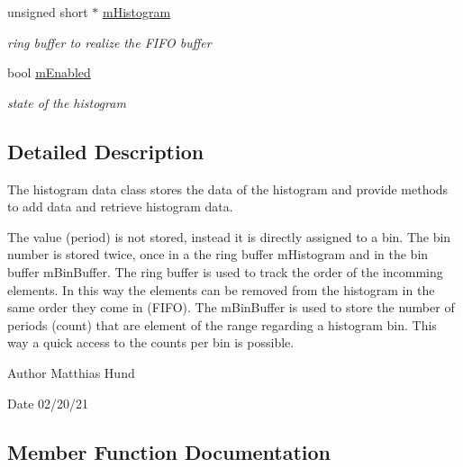 \begin{DoxyCompactItemize}
\mbox{\label{classHistogramData_a7ad41d77119ca0442b8c31f7f8122a8b}} 
unsigned short $\ast$ \hyperlink{classHistogramData_a7ad41d77119ca0442b8c31f7f8122a8b}{m\+Histogram}
\begin{DoxyCompactList}\small\item\em ring buffer to realize the F\+I\+FO buffer \end{DoxyCompactList}\item 
\mbox{\label{classHistogramData_ac4405af2986dc6b78d684fd2a827d280}} 
bool \hyperlink{classHistogramData_ac4405af2986dc6b78d684fd2a827d280}{m\+Enabled}
\begin{DoxyCompactList}\small\item\em state of the histogram \end{DoxyCompactList}\end{DoxyCompactItemize}


\subsection{Detailed Description}
The histogram data class stores the data of the histogram and provide methods to add data and retrieve histogram data. 

The value (period) is not stored, instead it is directly assigned to a bin. The bin number is stored twice, once in a the ring buffer m\+Histogram and in the bin buffer m\+Bin\+Buffer. The ring buffer is used to track the order of the incomming elements. In this way the elements can be removed from the histogram in the same order they come in (F\+I\+FO). The m\+Bin\+Buffer is used to store the number of periods (count) that are element of the range regarding a histogram bin. This way a quick access to the counts per bin is possible.

\begin{DoxyAuthor}{Author}
Matthias Hund 
\end{DoxyAuthor}
\begin{DoxyDate}{Date}
02/20/21 
\end{DoxyDate}


\subsection{Member Function Documentation}
\mbox{\label{classHistogramData_ab9313f2ca9852a85fd9f7da57c40f95b}} 
